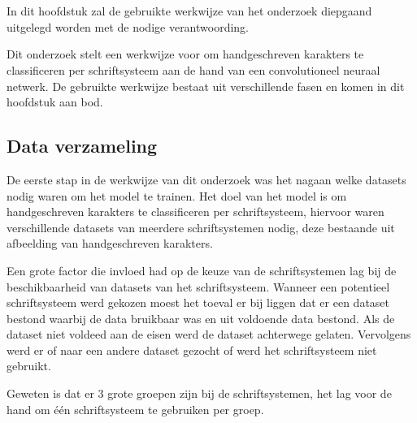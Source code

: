 
\chapter{}
\label{ch:methodologie}


In dit hoofdstuk zal de gebruikte werkwijze van het onderzoek diepgaand uitgelegd worden met de nodige verantwoording.

Dit onderzoek stelt een werkwijze voor om handgeschreven karakters te classificeren per schriftsysteem aan de hand van een convolutioneel neuraal netwerk.
De gebruikte werkwijze bestaat uit verschillende fasen en komen in dit hoofdstuk aan bod.


\section{Data verzameling}

De eerste stap in de werkwijze van dit onderzoek was het nagaan welke datasets nodig waren om het model te trainen.
Het doel van het model is om handgeschreven karakters te classificeren per schriftsysteem, hiervoor waren verschillende datasets van meerdere schriftsystemen nodig, deze bestaande uit afbeelding van handgeschreven karakters.

Een grote factor die invloed had op de keuze van de schriftsystemen lag bij de beschikbaarheid van datasets van het schriftsysteem.
Wanneer een potentieel schriftsysteem werd gekozen moest het toeval er bij liggen dat er een dataset bestond waarbij de data bruikbaar was en uit voldoende data bestond.
Als de dataset niet voldeed aan de eisen werd de dataset achterwege gelaten.
Vervolgens werd er of naar een andere dataset gezocht of werd het schriftsysteem niet gebruikt.



Geweten is dat er 3 grote groepen zijn bij de schriftsystemen, het lag voor de hand om één schriftsysteem te gebruiken per groep.

